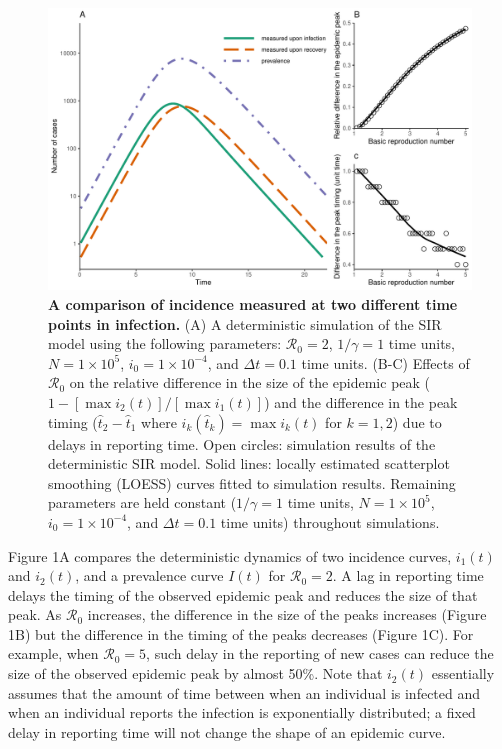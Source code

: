 \documentclass[12pt]{article}\usepackage[]{graphicx}\usepackage[]{color}
\begin{document}
\begin{figure}[!t]
\includegraphics[width=\textwidth]{example.pdf}
\caption{
\textbf{A comparison of incidence measured at two different time points in infection.}
(A) 
A deterministic simulation of the SIR model using the following parameters: 
$\mathcal R_0 = 2$, $1/\gamma = 1$ time units, $N = 1 \times 10^5$, $i_0 = 1 \times 10^{-4}$,
and $\Delta t = 0.1$ time units.
(B-C) Effects of $\mathcal R_0$ on the relative difference in the size of the epidemic peak ($1 - [\max i_2(t)]/[\max i_1(t)]$) and the difference in the peak timing ($\hat{t}_2 - \hat{t}_1$ where $i_k(\hat{t}_k) = \max i_k(t)$ for $k = 1, 2$) due to delays in reporting time.
Open circles: simulation results of the deterministic SIR model.
Solid lines: locally estimated scatterplot smoothing (LOESS) curves fitted to simulation results.
Remaining parameters are held constant ($1/\gamma = 1$ time units, $N = 1 \times 10^5$, $i_0 = 1 \times 10^{-4}$, and $\Delta t = 0.1$ time units) throughout simulations.
}
\end{figure}

Figure 1A compares the deterministic dynamics of two incidence curves,
$i_1(t)$ and $i_2(t)$, and a prevalence curve $I(t)$ for $\mathcal R_0 = 2$. 
A lag in reporting time delays
the timing of the observed epidemic peak and reduces the size of that peak.
As $\mathcal R_0$ increases, the difference in the size of the peaks increases (Figure 1B)
but the difference in the timing of the peaks decreases (Figure 1C).
For example, when $\mathcal R_0 = 5$, such delay in the reporting of new cases can reduce the size of the observed epidemic peak by almost 50\%.
Note that $i_2(t)$ essentially assumes that the amount of time between when an individual is infected and when an individual reports the infection is exponentially distributed; a fixed delay in reporting time will not change the shape of an epidemic curve.
\end{document}
